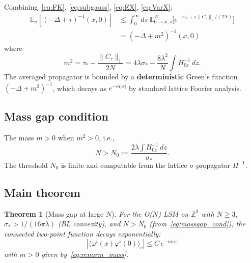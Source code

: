\documentclass[12pt]{article}
\newtheorem{theorem}{Theorem}
\theoremstyle{definition}
\theoremstyle{remark}
\newcommand{\Z}{\mathbb{Z}}
\newcommand{\E}{\mathbb{E}}
\newcommand{\ph}{\varphi}
\begin{document}
Combining~\eqref{eq:FK}, \eqref{eq:subgauss}, \eqref{eq:EX},
\eqref{eq:VarX}:
\begin{align}
  \E_\sigma[(-\Delta+\tau)^{-1}(x,0)]
    &\le \int_0^\infty\!ds\;\E^W_{0\to x,s}\!\bigl[
      e^{-s\tau_* + s\|C_\tau\|_1/(2N)}\bigr] \nonumber \\
    &= \boxed{(-\Delta + m^2)^{-1}(x,0)}
\end{align}
where
\begin{equation}
\label{eq:renorm_mass}
  m^2 = \tau_* - \frac{\|C_\tau\|_1}{2N}
      = 4\lambda\sigma_* - \frac{8\lambda^2}{N}\int\!H^{-1}_{0z}\,dz.
\end{equation}
The averaged propagator is bounded by a \textbf{deterministic}
Green's function $(-\Delta+m^2)^{-1}$, which decays as
$e^{-m|x|}$ by standard lattice Fourier analysis.

\subsection{Mass gap condition}

The mass $m > 0$ when $m^2 > 0$, i.e.,
\begin{equation}
\label{eq:massgap_cond}
  N > N_0 := \frac{2\lambda\int H^{-1}_{0z}\,dz}{\sigma_*}.
\end{equation}
The threshold $N_0$ is finite and computable from the lattice
$\sigma$-propagator $H^{-1}$.

\subsection{Main theorem}

\begin{theorem}[Mass gap at large $N$]
\label{thm:main}
For the O($N$) LSM on $\Z^2$ with $N \ge 3$,
$\sigma_* > 1/(16\pi\lambda)$ (BL convexity), and
$N > N_0$ (from~\eqref{eq:massgap_cond}), the connected
two-point function decays exponentially:
\begin{equation}
  |\langle\ph^i(x)\ph^i(0)\rangle_c| \le C\,e^{-m|x|}
\end{equation}
with $m > 0$ given by~\eqref{eq:renorm_mass}.
\end{theorem}
\end{document}
